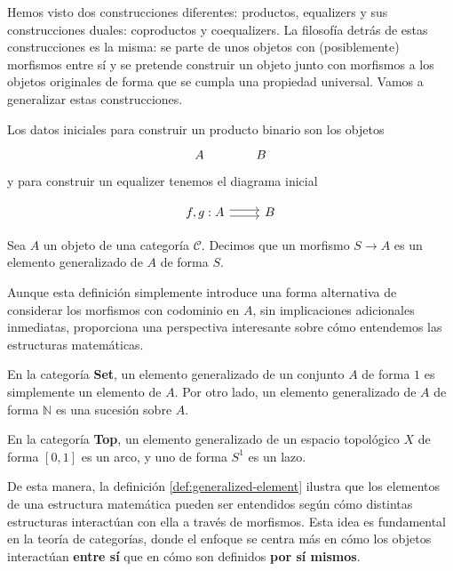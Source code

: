 Hemos visto dos construcciones diferentes: productos, equalizers y sus construcciones duales: coproductos y coequalizers. La filosofía detrás de estas construcciones es la misma: se parte de unos objetos con (posiblemente) morfismos entre sí y se pretende construir un objeto junto con morfismos a los objetos originales de forma que se cumpla una propiedad universal. Vamos a generalizar estas construcciones.

Los datos iniciales para construir un producto binario son los objetos

\begin{equation} \label{data:iniciales-producto}
    A \hspace{1.5cm} B
\end{equation}

y para construir un equalizer tenemos el diagrama inicial

\begin{equation} \label{data:iniciales-equalizer}
    \begin{tikzcd}
        f,g: A \arrow[r, shift left]{f} \arrow[r, shift right]{g} & B
    \end{tikzcd}
\end{equation}


\begin{definicion}  \label{def:generalized-element}
    Sea \( A \) un objeto de una categoría \( \mathscr{C} \). Decimos que un morfismo \( S \longrightarrow A \) es un elemento generalizado de \( A \) de forma \( S \).
\end{definicion}

Aunque esta definición simplemente introduce una forma alternativa de considerar los morfismos con codominio en \( A \), sin implicaciones adicionales inmediatas, proporciona una perspectiva interesante sobre cómo entendemos las estructuras matemáticas.

En la categoría \textbf{Set}, un elemento generalizado de un conjunto \( A \) de forma \( 1 \) es simplemente un elemento de \( A \). Por otro lado, un elemento generalizado de \( A \) de forma \( \mathbb{N} \) es una sucesión sobre \( A \).

En la categoría \textbf{Top}, un elemento generalizado de un espacio topológico \( X \) de forma \( [0,1] \) es un arco, y uno de forma \( S^1 \) es un lazo.

De esta manera, la definición \ref{def:generalized-element} ilustra que los elementos de una estructura matemática pueden ser entendidos según cómo distintas estructuras interactúan con ella a través de morfismos. Esta idea es fundamental en la teoría de categorías, donde el enfoque se centra más en cómo los objetos interactúan \textbf{entre sí} que en cómo son definidos \textbf{por sí mismos}.

